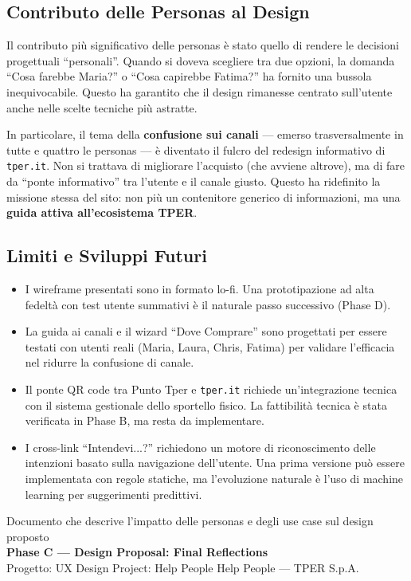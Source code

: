 \subsection{Contributo delle Personas al Design}

Il contributo pi\`u significativo delle personas \`e stato quello di rendere le decisioni progettuali ``personali''. Quando si doveva scegliere tra due opzioni, la domanda ``Cosa farebbe Maria?'' o ``Cosa capirebbe Fatima?'' ha fornito una bussola inequivocabile. Questo ha garantito che il design rimanesse centrato sull'utente anche nelle scelte tecniche pi\`u astratte.

In particolare, il tema della \textbf{confusione sui canali} --- emerso trasversalmente in tutte e quattro le personas --- \`e diventato il fulcro del redesign informativo di \texttt{tper.it}. Non si trattava di migliorare l'acquisto (che avviene altrove), ma di fare da ``ponte informativo'' tra l'utente e il canale giusto. Questo ha ridefinito la missione stessa del sito: non pi\`u un contenitore generico di informazioni, ma una \textbf{guida attiva all'ecosistema TPER}.

\subsection{Limiti e Sviluppi Futuri}

\begin{itemize}
    \item I wireframe presentati sono in formato lo-fi. Una prototipazione ad alta fedelt\`a con test utente summativi \`e il naturale passo successivo (Phase D).
    \item La guida ai canali e il wizard ``Dove Comprare'' sono progettati per essere testati con utenti reali (Maria, Laura, Chris, Fatima) per validare l'efficacia nel ridurre la confusione di canale.
    \item Il ponte QR code tra Punto Tper e \texttt{tper.it} richiede un'integrazione tecnica con il sistema gestionale dello sportello fisico. La fattibilit\`a tecnica \`e stata verificata in Phase B, ma resta da implementare.
    \item I cross-link ``Intendevi...?'' richiedono un motore di riconoscimento delle intenzioni basato sulla navigazione dell'utente. Una prima versione pu\`o essere implementata con regole statiche, ma l'evoluzione naturale \`e l'uso di machine learning per suggerimenti predittivi.
\end{itemize}

\vspace{0.5cm}

\begin{center}
{\color{secondaryColor}\small
Documento che descrive l'impatto delle personas e degli use case sul design proposto \\[4pt]
\textbf{Phase C --- Design Proposal: Final Reflections} \\[4pt]
Progetto: UX Design Project: Help People Help People --- TPER S.p.A.}
\end{center}
